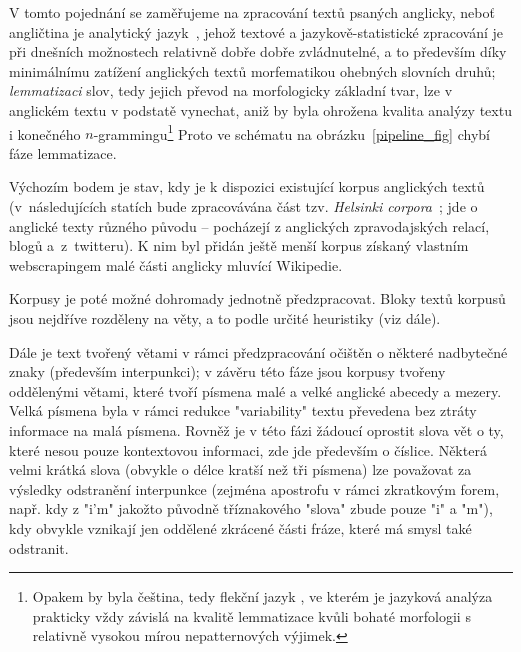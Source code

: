 V tomto pojednání se zaměřujeme na
zpracování textů psaných anglicky, neboť angličtina je
analytický
jazyk~\cite{Gorblach1991}, jehož textové a
jazykově-statistické zpracování
je při dnešních možnostech relativně dobře dobře zvládnutelné, a to
především díky minimálnímu zatížení anglických textů morfematikou%
ohebných slovních druhů; \textit{lemmatizaci} slov, tedy
jejich převod
na morfologicky základní tvar, lze v anglickém textu
v podstatě vynechat, aniž by byla ohrožena kvalita analýzy textu i konečného
$n$-grammingu\footnote{Opakem by byla čeština, tedy flekční jazyk%
, ve kterém
je jazyková analýza prakticky vždy závislá na kvalitě lemmatizace%
 kvůli bohaté
morfologii s relativně vysokou mírou nepatternových výjimek.} Proto ve
schématu na obrázku~\ref{pipeline_fig} chybí fáze lemmatizace.

Výchozím bodem je stav, kdy je k dispozici existující korpus
anglických textů
(v~následujících statích bude zpracovávána část tzv.
\textit{Helsinki corpora}~\cite{Kytoo1996};
jde o anglické texty různého
původu -- pocházejí z anglických zpravodajských relací, blogů
a~z~twitteru). K nim byl
přidán ještě menší korpus získaný vlastním webscrapingem
malé části
anglicky mluvící Wikipedie.

Korpusy je poté možné dohromady jednotně předzpracovat.
Bloky textů korpusů jsou nejdříve rozděleny na věty, a to podle určité
heuristiky (viz dále).

Dále je text tvořený větami v rámci předzpracování očištěn
o některé nadbytečné znaky (především interpunkci);
v závěru této fáze jsou korpusy tvořeny
oddělenými větami, které tvoří písmena malé a velké anglické abecedy
a mezery. Velká písmena byla v rámci redukce "variability" textu převedena
bez ztráty informace na malá písmena. Rovněž je v této fázi žádoucí
oprostit slova vět o ty, které nesou pouze kontextovou informaci, zde jde
především o číslice. Některá velmi krátká slova (obvykle o délce kratší
než tři písmena) lze považovat za výsledky odstranění interpunkce%
 (zejména
apostrofu v rámci zkratkovým forem, např. kdy z "i'm" jakožto původně
tříznakového "slova" zbude pouze "i" a "m"), kdy obvykle vznikají jen
oddělené zkrácené části fráze, které má smysl také odstranit.

